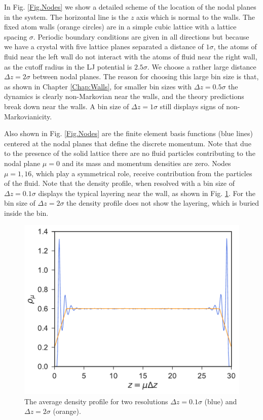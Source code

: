 \documentclass[b5paper,openright,10pt]{book}
\begin{document}
In Fig. \ref{Fig.Nodes}  we show a detailed scheme of  the location of
the nodal planes  in the system.  The horizontal line  is the $z$ axis
which is normal  to the walls. The fixed atom  walls (orange circles) are
in a  simple cubic lattice  with a lattice spacing  $\sigma$. Periodic
boundary conditions are given in all  directions but because we have a
crystal with five lattice planes separated a distance of $1\sigma$, the
atoms of fluid  near the left wall  do not interact with  the atoms of
fluid near the  right wall, as the cutoff radius  in the LJ
potential is $2.5\sigma$.  
We  choose a
rather  large distance  $\Delta z=2\sigma$  between nodal  planes. The
reason for choosing this large bin size is that, as shown in Chapter \ref{Chap:Walls},
for  smaller bin  sizes with  $\Delta  z =0.5\sigma$  the dynamics  is
clearly non-Markovian near the walls, and the theory predictions break
down near the  walls. A bin size of $\Delta  z=1\sigma$ still displays signs
of non-Markovianicity. 

Also  shown in  Fig.   \ref{Fig.Nodes} are  the  finite element  basis
functions (blue lines) centered  at the  nodal  planes  that define  the  discrete
momentum.   Note
that  due to  the presence  of the  solid lattice  there are  no fluid
particles contributing  to the  nodal plane $\mu=0$  and its  mass and
momentum  densities   are  zero.   Nodes  $\mu=1,16$,   which  play  a
symmetrical  role,  receive  contribution  from  the  particles  of  the
fluid. Note that the density profile, when resolved with a bin size of
$\Delta z=0.1\sigma$ displays  the typical layering near  the wall, as
shown in Fig. \ref{Fig:DensityResolved}. For the bin size of $\Delta z
= 2\sigma$  the density profile does  not show the layering,  which is
buried  inside the  bin. 
\begin{figure}
  \centering
\includegraphics[scale=0.41]{Density-01sigma-2sigma}
\caption[The average density profile for two resolutions]{The average  density profile  for two resolutions  $\Delta z=
  0.1\sigma$ (blue) and  $\Delta  z=2\sigma$ (orange).}
\label{Fig:DensityResolved}
\end{figure}
\end{document}
